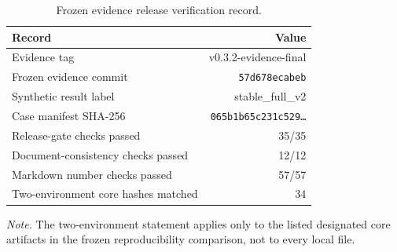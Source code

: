 \begin{table}[!ht]
\centering
\caption{Frozen evidence release verification record.}
\label{tab:reproducibility}
\small
\begin{tabular}{lr}
\toprule
Record & Value \\
\midrule
Evidence tag & v0.3.2-evidence-final \\
Frozen evidence commit & \texttt{57d678ecabeb} \\
Synthetic result label & stable\_full\_v2 \\
Case manifest SHA-256 & \texttt{065b1b65c231c529\ldots} \\
Release-gate checks passed & 35/35 \\
Document-consistency checks passed & 12/12 \\
Markdown number checks passed & 57/57 \\
Two-environment core hashes matched & 34 \\
\bottomrule
\end{tabular}
\par\smallskip
\begin{minipage}{0.94\linewidth}
\footnotesize\textit{Note.} The two-environment statement applies only to the listed designated core artifacts in the frozen reproducibility comparison, not to every local file.
\end{minipage}
\end{table}
